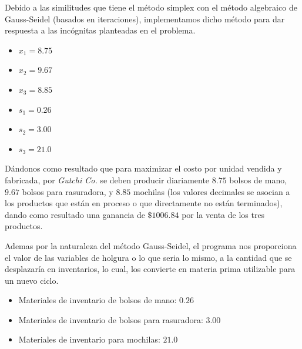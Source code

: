 \documentclass[conference]{IEEEtran}
\begin{document}
Debido a las similitudes que tiene el método simplex con el método
algebraico de Gauss-Seidel (basados en iteraciones), implementamos dicho
método para dar respuesta a las incógnitas planteadas en el problema.

\begin{itemize}
    \item $x_{1} = 8.75$
    \item $x_{2} = 9.67$
    \item $x_{3} = 8.85$
    \item $s_{1} = 0.26$
    \item $s_{2} = 3.00$
    \item $s_{3} = 21.0$
\end{itemize}

Dándonos como resultado que para maximizar el costo por unidad vendida y
fabricada, por \textit{Gutchi Co.} se deben producir diariamente $8.75$ bolsos de mano,
$9.67$ bolsos para rasuradora, y $8.85$ mochilas (los valores decimales
se asocian a los productos que están en proceso o que directamente
no están terminados), dando como resultado una ganancia de $\$1006.84$ por
la venta de los tres productos.

Ademas por la naturaleza del método Gauss-Seidel, el programa nos proporciona
el valor de las variables de holgura o lo que seria lo mismo, a la cantidad
que se desplazaría en inventarios, lo cual, los convierte en materia
prima utilizable para un nuevo ciclo.

\begin{itemize}
    \item Materiales de inventario de bolsos de mano: $0.26$
    \item Materiales de inventario de bolsos para rasuradora: $3.00$
    \item Materiales de inventario para mochilas: $21.0$
\end{itemize}


\end{document}
